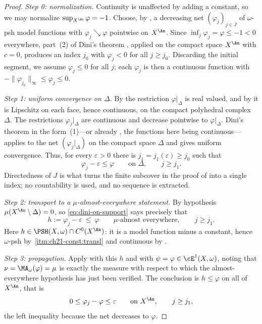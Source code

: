 \begin{proof}
\emph{Step 0: normalization.}  Continuity is unaffected by adding a
constant, so we may normalize
\(\sup_{X^{\An}}\varphi=-1\).  Choose, by
, a decreasing net
\((\varphi_j)_{j\in J}\) of \(\omega\)-psh model functions with
\(\varphi_j\searrow\varphi\) pointwise on \(X^{\An}\).  Since
\(\inf_j\varphi_j=\varphi\leq-1<0\) everywhere, part~(2) of Dini's theorem
, applied on the compact space \(X^{\An}\) with
\(c=0\), produces an index \(j_0\) with \(\varphi_j<0\) for all
\(j\geq j_0\).  Discarding the initial segment, we assume
\(\varphi_j\leq0\) for all \(j\); each \(\varphi_j\) is then a continuous
function with \(-\lVert\varphi_{j_0}\rVert_\infty\leq\varphi_j\leq0\).

\emph{Step 1: uniform convergence on \(\Delta\).}  By
 the restriction
\(\varphi|_\Delta\) is real valued, and by
 it is Lipschitz on each face, hence
continuous, on the compact polyhedral complex \(\Delta\).  The restrictions
\(\varphi_j|_\Delta\) are continuous and decrease pointwise to
\(\varphi|_\Delta\).  Dini's theorem in the form
\,(1)---or already
, the functions here being continuous---applies to the
net \((\varphi_j|_\Delta)\) on the compact space \(\Delta\) and gives
uniform convergence.  Thus, for every \(\varepsilon>0\) there is
\(j_1=j_1(\varepsilon)\geq j_0\) such that
\begin{equation}
\label{eq:dini-on-support}
                    \varphi_j-\varepsilon\leq\varphi
                    \qquad\text{on }\Delta,\qquad j\geq j_1 .
\end{equation}
Directedness of \(J\) is what turns the finite subcover in the proof of
 into a single index; no countability is used, and no
sequence is extracted.

\emph{Step 2: transport to a \(\mu\)-almost-everywhere statement.}  By
hypothesis \(\mu(X^{\An}\setminus\Delta)=0\), so
\eqref{eq:dini-on-support} says precisely that
\[
 h:=\varphi_j-\varepsilon\ \leq\ \varphi
 \qquad\mu\text{-almost everywhere},\qquad j\geq j_1 .
\]
Here \(h\in\PSH(X,\omega)\cap C^0(X^{\An})\): it is a model function minus a
constant, hence \(\omega\)-psh by
\,\cref{itm:ch21-const:transl} and continuous by
.

\emph{Step 3: propagation.}  Apply  with
this \(h\) and with \(\psi=\varphi\in\cE^1(X,\omega)\), noting that
\(\nu=\MA_\omega(\varphi)=\mu\) is exactly the measure with respect to which
the almost-everywhere hypothesis has just been verified.  The conclusion is
\(h\leq\varphi\) on all of \(X^{\An}\), that is
\[
                  0\leq\varphi_j-\varphi\leq\varepsilon
                  \qquad\text{on }X^{\An},\qquad j\geq j_1 ,
\]
the left inequality because the net decreases to \(\varphi\).


\end{proof}
